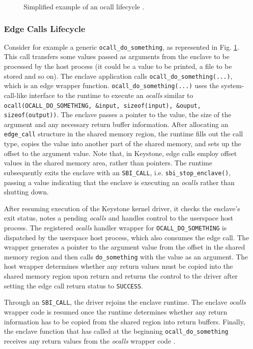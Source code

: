 \begin{figure}[h!]
    \centering
    
    \caption{Simplified example of an ocall lifecycle \cite{keystone-doc}.}
    \label{ocall-lifecycle}
\end{figure}

\subsubsection{Edge Calls Lifecycle}
Consider for example a generic \texttt{ocall\_do\_something}, as represented in Fig. \ref{ocall-lifecycle}. This call transfers some values passed as arguments from the enclave to be processed by the host process (it could be a value to be printed, a file to be stored and so on). The enclave application calls \texttt{ocall\_do\_something(...)}, which is an edge wrapper function.
\texttt{ocall\_do\_something(...)} uses the system-call-like interface to the runtime to execute an \textit{ocalls} similar to \texttt{ocall(OCALL\_DO\_SOMETHING, \&input, sizeof(input), \&ouput,  sizeof(output))}. The enclave passes a pointer to the value, the size of the argument and any necessary return buffer information. 
After allocating an \texttt{edge\_call} structure in the shared memory region, the runtime fills out the call type, copies the value into another part of the shared memory, and sets up the offset to the argument value. Note that, in Keystone, edge calls employ offset values in the shared memory area, rather than pointers.
The runtime subsequently exits the enclave with an \texttt{SBI\_CALL}, i.e. \texttt{sbi\_stop\_enclave()}, passing a value indicating that the enclave is executing an \textit{ocalls} rather than shutting down. 

After resuming execution of the Keystone kernel driver, it checks the enclave's exit status, notes a pending \textit{ocalls} and handles control to the userspace host process. 
The registered \textit{ocalls} handler wrapper for \texttt{OCALL\_DO\_SOMETHING} is dispatched by the userspace host process, which also consumes the edge call. The wrapper generates a pointer to the argument value from the offset in the shared memory region and then calls \texttt{do\_something} with the value as an argument. The host wrapper determines whether any return values must be copied into the shared memory region upon return and returns the control to the driver after setting the edge call return status to \texttt{SUCCESS}. 

Through an \texttt{SBI\_CALL}, the driver rejoins the enclave runtime. The enclave \textit{ocalls} wrapper code is resumed once the runtime determines whether any return information has to be copied from the shared region into return buffers. Finally, the enclave function that has called at the beginning \texttt{ocall\_do\_something} receives any return values from the \textit{ocalls} wrapper code \cite{keystone-doc}.


